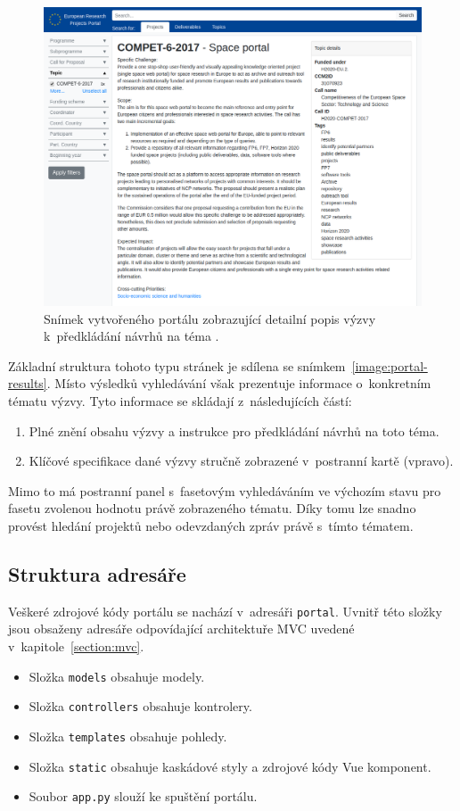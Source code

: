 \begin{figure}[H]
	\centering
	\includegraphics[width=\textwidth]{obrazky-figures/my-topic.png}
	\caption{Snímek vytvořeného portálu zobrazující detailní popis výzvy k~předkládání návrhů na téma .}
	\label{image:portal-detail}
\end{figure}

Základní struktura tohoto typu stránek je sdílena se snímkem~\ref{image:portal-results}. Místo výsledků vyhledávání však prezentuje informace o~konkretním tématu výzvy. Tyto informace se skládají z~následujících částí:
\begin{enumerate}
    \item Plné znění obsahu výzvy a instrukce pro předkládání návrhů na toto téma.
    \item Klíčové specifikace dané výzvy stručně zobrazené v~postranní kartě (vpravo).
\end{enumerate}

Mimo to má postranní panel s~fasetovým vyhledáváním ve výchozím stavu pro fasetu  zvolenou hodnotu právě zobrazeného tématu. Díky tomu lze snadno provést hledání projektů nebo odevzdaných zpráv právě s~tímto tématem.

\subsection{Struktura adresáře}
Veškeré zdrojové kódy portálu se nachází v~adresáři \texttt{portal}. Uvnitř této složky jsou obsaženy adresáře odpovídající architektuře MVC uvedené v~kapitole~\ref{section:mvc}.
\begin{itemize}
  \item Složka \texttt{models} obsahuje modely.
  \item Složka \texttt{controllers} obsahuje kontrolery.
  \item Složka \texttt{templates} obsahuje pohledy.
  \item Složka \texttt{static} obsahuje kaskádové styly a zdrojové kódy Vue komponent.
  \item Soubor \texttt{app.py} slouží ke spuštění portálu.
\end{itemize}


